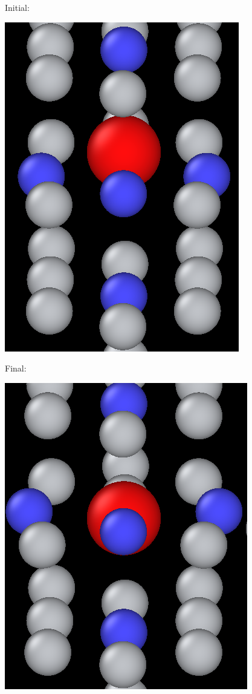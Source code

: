 \documentclass[11pt]{article}
\begin{document}
Initial:
\begin{center}
\includegraphics[width=.9\linewidth]{Images/final_model_final_tetra_ox.png}
\end{center}

Final:
\begin{center}
\includegraphics[width=.9\linewidth]{Images/final_model_initial_tetra_ox_ovito.png}
\end{center}
\end{document}
